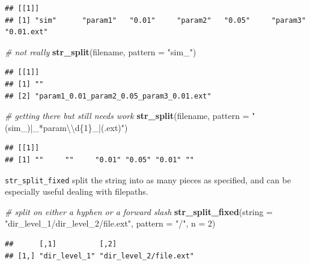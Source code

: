 \documentclass[]{book}
\newenvironment{Shaded}{}{}
\newcommand{\CharTok}[1]{\textcolor[rgb]{0.25,0.44,0.63}{#1}}
\newcommand{\CommentTok}[1]{\textcolor[rgb]{0.38,0.63,0.69}{\textit{#1}}}
\newcommand{\DataTypeTok}[1]{\textcolor[rgb]{0.56,0.13,0.00}{#1}}
\newcommand{\DecValTok}[1]{\textcolor[rgb]{0.25,0.63,0.44}{#1}}
\newcommand{\KeywordTok}[1]{\textcolor[rgb]{0.00,0.44,0.13}{\textbf{#1}}}
\newcommand{\NormalTok}[1]{#1}
\newcommand{\StringTok}[1]{\textcolor[rgb]{0.25,0.44,0.63}{#1}}
\begin{document}
\begin{verbatim}
## [[1]]
## [1] "sim"      "param1"   "0.01"     "param2"   "0.05"     "param3"   "0.01.ext"
\end{verbatim}

\begin{Shaded}
\begin{Highlighting}[]
\CommentTok{# not really}
\KeywordTok{str_split}\NormalTok{(filename,}
          \DataTypeTok{pattern =} \StringTok{"sim_"}\NormalTok{)}
\end{Highlighting}
\end{Shaded}

\begin{verbatim}
## [[1]]
## [1] ""                                       
## [2] "param1_0.01_param2_0.05_param3_0.01.ext"
\end{verbatim}

\begin{Shaded}
\begin{Highlighting}[]
\CommentTok{# getting there but still needs work}
\KeywordTok{str_split}\NormalTok{(filename,}
          \DataTypeTok{pattern =} \StringTok{"(sim_)|_*param}\CharTok{\textbackslash{}\textbackslash{}}\StringTok{d\{1\}_|(.ext)"}\NormalTok{)}
\end{Highlighting}
\end{Shaded}

\begin{verbatim}
## [[1]]
## [1] ""     ""     "0.01" "0.05" "0.01" ""
\end{verbatim}

\texttt{str\_split\_fixed} split the string into as many pieces as specified, and can be especially useful dealing with filepaths.

\begin{Shaded}
\begin{Highlighting}[]
\CommentTok{# split on either a hyphen or a forward slash}
\KeywordTok{str_split_fixed}\NormalTok{(}\DataTypeTok{string =} \StringTok{"dir_level_1/dir_level_2/file.ext"}\NormalTok{, }
          \DataTypeTok{pattern =} \StringTok{"/"}\NormalTok{,}
          \DataTypeTok{n =} \DecValTok{2}\NormalTok{)}
\end{Highlighting}
\end{Shaded}

\begin{verbatim}
##      [,1]          [,2]                  
## [1,] "dir_level_1" "dir_level_2/file.ext"
\end{verbatim}
\end{document}
